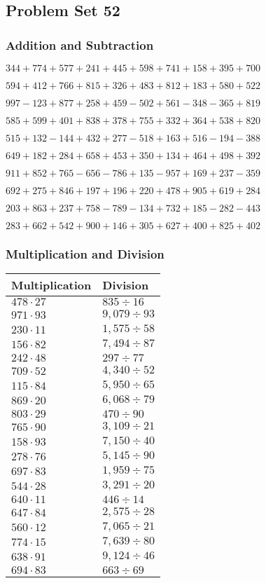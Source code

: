 \hypertarget{problem-set-52-1}{%
\subsection{Problem Set 52}\label{problem-set-52-1}}

\hypertarget{addition-and-subtraction-152}{%
\subsubsection{Addition and
Subtraction}\label{addition-and-subtraction-152}}

\(344 + 774 + 577 + 241 + 445 + 598 + 741 + 158 + 395 + 700\)

\(594 + 412 + 766 + 815 + 326 + 483 + 812 + 183 + 580 + 522\)

\(997 - 123 + 877 + 258 + 459 - 502 + 561 - 348 - 365 + 819\)

\(585 + 599 + 401 + 838 + 378 + 755 + 332 + 364 + 538 + 820\)

\(515 + 132 - 144 + 432 + 277 - 518 + 163 + 516 - 194 - 388\)

\(649 + 182 + 284 + 658 + 453 + 350 + 134 + 464 + 498 + 392\)

\(911 + 852 + 765 - 656 - 786 + 135 - 957 + 169 + 237 - 359\)

\(692 + 275 + 846 + 197 + 196 + 220 + 478 + 905 + 619 + 284\)

\(203 + 863 + 237 + 758 - 789 - 134 + 732 + 185 - 282 - 443\)

\(283 + 662 + 542 + 900 + 146 + 305 + 627 + 400 + 825 + 402\)

\hypertarget{multiplication-and-division-152}{%
\subsubsection{Multiplication and
Division}\label{multiplication-and-division-152}}

\begin{longtable}[]{@{}ll@{}}
\toprule
Multiplication & Division\tabularnewline
\midrule
\endhead
\(478 \cdot 27\) & \(835÷16\)\tabularnewline
\(971 \cdot 93\) & \(9,079÷93\)\tabularnewline
\(230 \cdot 11\) & \(1,575÷58\)\tabularnewline
\(156 \cdot 82\) & \(7,494÷87\)\tabularnewline
\(242 \cdot 48\) & \(297÷77\)\tabularnewline
\(709 \cdot 52\) & \(4,340÷52\)\tabularnewline
\(115 \cdot 84\) & \(5,950÷65\)\tabularnewline
\(869 \cdot 20\) & \(6,068÷79\)\tabularnewline
\(803 \cdot 29\) & \(470÷90\)\tabularnewline
\(765 \cdot 90\) & \(3,109÷21\)\tabularnewline
\(158 \cdot 93\) & \(7,150÷40\)\tabularnewline
\(278 \cdot 76\) & \(5,145÷90\)\tabularnewline
\(697 \cdot 83\) & \(1,959÷75\)\tabularnewline
\(544 \cdot 28\) & \(3,291÷20\)\tabularnewline
\(640 \cdot 11\) & \(446÷14\)\tabularnewline
\(647 \cdot 84\) & \(2,575÷28\)\tabularnewline
\(560 \cdot 12\) & \(7,065÷21\)\tabularnewline
\(774 \cdot 15\) & \(7,639÷80\)\tabularnewline
\(638 \cdot 91\) & \(9,124÷46\)\tabularnewline
\(694 \cdot 83\) & \(663÷69\)\tabularnewline
\bottomrule
\end{longtable}

